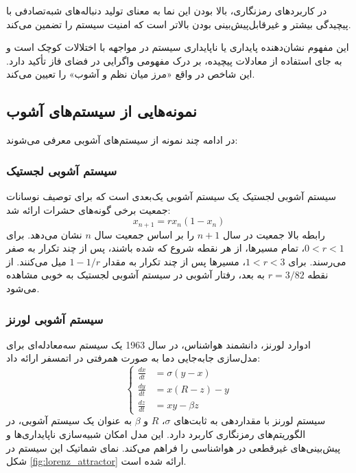 در کاربردهای رمزنگاری، بالا بودن این نما به معنای تولید دنباله‌های شبه‌تصادفی با پیچیدگی بیشتر و غیرقابل‌پیش‌بینی بودن بالاتر است که امنیت سیستم را تضمین می‌کند. 

این مفهوم نشان‌دهنده پایداری یا ناپایداری سیستم در مواجهه با اختلالات کوچک است و به جای استفاده از معادلات پیچیده، بر درک مفهومی واگرایی در فضای فاز تأکید دارد. این شاخص در واقع «مرز میان نظم و آشوب» را تعیین می‌کند.

\subsection{نمونه‌هایی از سیستم‌های آشوب}
در ادامه چند نمونه از سیستم‌های آشوبی معرفی می‌شوند:

\subsubsection{سیستم آشوبی لجستیک}
سیستم آشوبی لجستیک یک سیستم آشوبی یک‌بعدی است که برای توصیف نوسانات جمعیت برخی گونه‌های حشرات ارائه شد:
\begin{equation} \label{eq:logistic}
x_{n+1} = r x_n (1 - x_n)
\end{equation}
رابطه بالا جمعیت در سال $n+1$ را بر اساس جمعیت سال $n$ نشان می‌دهد. برای $0 < r < 1$، تمام مسیرها، از هر نقطه شروع که شده باشند، پس از چند تکرار به صفر می‌رسند. برای $1 < r < 3$، مسیرها پس از چند تکرار به مقدار $1-1/r$ میل می‌کنند. از نقطه $r=3/82$ به بعد، رفتار آشوبی در سیستم آشوبی لجستیک به خوبی مشاهده می‌شود\cite{ref14}.

\subsubsection{سیستم آشوبی لورنز}
ادوارد لورنز، دانشمند هواشناس، در سال 1963 یک سیستم سه‌معادله‌ای برای مدل‌سازی جابه‌جایی دما به صورت همرفتی در اتمسفر ارائه داد:
\begin{equation} \label{eq:lorenz}
\left\{ \begin{aligned}
\frac{dx}{dt} &= \sigma (y - x) \\
\frac{dy}{dt} &= x (R - z) - y \\
\frac{dz}{dt} &= xy - \beta z
\end{aligned} \right.
\end{equation}
سیستم لورنز با مقداردهی به ثابت‌های $\sigma$، $R$ و $\beta$ به عنوان یک سیستم آشوبی، در الگوریتم‌های رمزنگاری کاربرد دارد. این مدل امکان شبیه‌سازی ناپایداری‌ها و پیش‌بینی‌های غیرقطعی در هواشناسی را فراهم می‌کند\cite{ref15, ref16}. نمای شماتیک این سیستم در شکل \ref{fig:lorenz_attractor} ارائه شده است.

